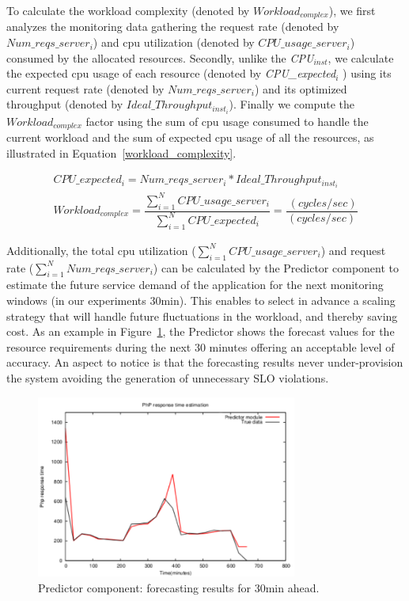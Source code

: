 To calculate the workload complexity (denoted by \emph{$Workload_{complex}$}), we first analyzes the monitoring data gathering the request rate (denoted by $Num\_reqs\_server_{i}$) and cpu utilization (denoted by \emph{$CPU\_usage\_server_{i}$}) consumed by the allocated resources. Secondly, unlike the \emph{CPU$_{inst}$},  we calculate the expected cpu usage of each resource (denoted by \emph{CPU\_expected$_{i}$} ) using its current request rate (denoted by $Num\_reqs\_server_{i}$) and its optimized throughput (denoted by $Ideal\_Throughput_{inst_{i}}$). Finally we compute the \emph{$Workload_{complex}$} factor using the sum of cpu usage consumed to handle the current workload and the sum of expected cpu usage of all the resources, as illustrated in Equation~\ref{workload_complexity}.

{\scriptsize
\begin{equation}\label{workload_complexity}
\begin{split}
CPU\_expected_{i} =  Num\_reqs\_server_{i}  * Ideal\_Throughput_{inst_{i}} \\
Workload_{complex}  = \dfrac{ \sum_{i=1}^N CPU\_usage\_server_{i}  }  {  \sum_{i=1}^N  CPU\_expected_{i}     } = \dfrac{ \ (cycles / sec) }  {  (cycles / sec ) }
\end{split}
\end{equation}
}

Additionally, the total cpu utilization ($\sum_{i=1}^N CPU\_usage\_server_{i} $) and request rate ($\sum_{i=1}^N  Num\_reqs\_server_{i}$) can be calculated by the Predictor component to estimate the future service demand of the application for the next monitoring windows (in our experiments 30min). This enables to select in advance a scaling strategy that will handle future fluctuations in the workload, and thereby saving cost. As an example in Figure~\ref{fig:forecast}, the Predictor shows the forecast values for the resource requirements during the next 30 minutes offering an acceptable level of accuracy. An aspect to notice is that the forecasting results never under-provision the system avoiding the generation of unnecessary SLO violations.

\begin{figure}[htb]
  \begin{center}
    \includegraphics[width=\linewidth,height=6cm]{images/prediction_conpaas_30min}
  \end{center}
\vspace{-5mm}
  \caption{Predictor component: forecasting results for 30min ahead.}
  \label{fig:forecast}
\end{figure}


